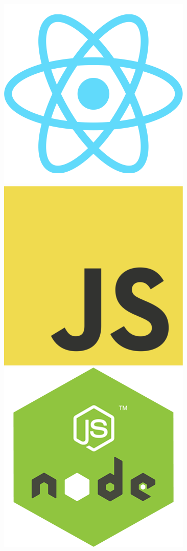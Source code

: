 \begin{figure}[htbp]
\begin{animateinline}{1}
    \newframe
    \includegraphics[scale=0.2]{./files/img/Codificacao/Animacao/React.png}      %
    \includegraphics[scale=0.2]{./files/img/Codificacao/Animacao/JavaScript.png} %
    \includegraphics[scale=0.2]{./files/img/Codificacao/Animacao/NodeJS.png}     %
  \end{animateinline}
  \legend{\selfAuthor}
\end{figure}

